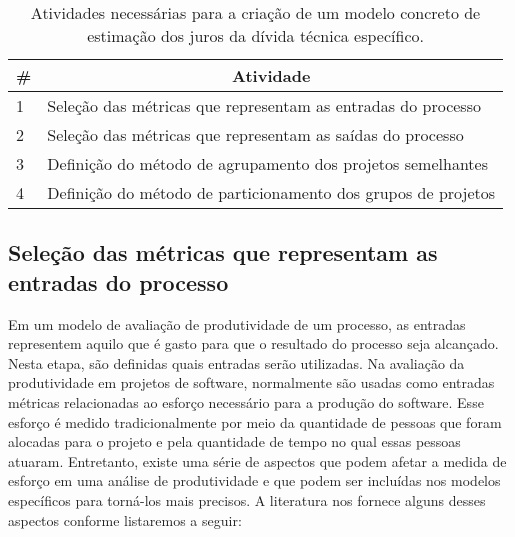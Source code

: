  
 \begin{table}[H]
 \centering
\caption{Atividades necessárias para a criação de um modelo concreto de estimação dos juros da dívida técnica específico.}
\label{cap_modelo_tabela_resumo_passos}
\begin{tabular}{|l|l|}
\hline
\# & \multicolumn{1}{c|}{Atividade}                                \\ \hline
1  & Seleção das métricas que representam as entradas do processo  \\ \hline
2  & Seleção das métricas que representam as saídas do processo    \\ \hline
3  & Definição do método de agrupamento dos projetos semelhantes   \\ \hline
4  & Definição do método de particionamento dos grupos de projetos \\ \hline
\end{tabular}
\end{table}


\subsection{Seleção das métricas que representam as entradas do processo}

Em um modelo de avaliação de produtividade de um processo, as entradas representem aquilo que é gasto para que o resultado do processo seja alcançado. Nesta etapa, são definidas quais entradas serão utilizadas. Na avaliação da produtividade em projetos de software, normalmente são usadas como entradas métricas relacionadas ao esforço necessário para a produção do software. Esse esforço é medido tradicionalmente por meio da quantidade de pessoas que foram alocadas para o projeto e pela quantidade de tempo no qual essas pessoas atuaram. Entretanto, existe uma série de aspectos que podem afetar a medida de esforço em uma análise de produtividade e que podem ser incluídas nos modelos específicos para torná-los mais precisos. A literatura nos fornece alguns desses aspectos conforme listaremos a seguir:

